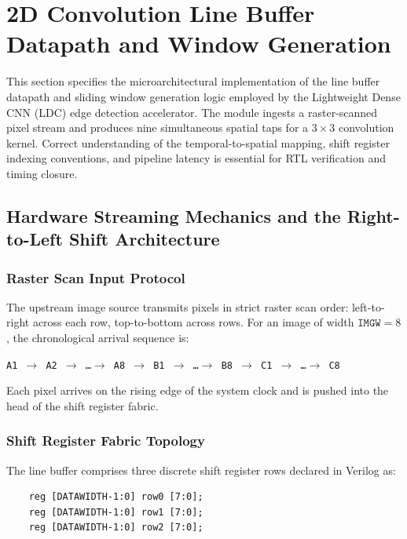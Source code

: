 \documentclass[11pt,a4paper]{report}
\begin{document}
\section{2D Convolution Line Buffer Datapath and Window Generation}

This section specifies the microarchitectural implementation of the line buffer datapath and sliding window generation logic employed by the Lightweight Dense CNN (LDC) edge detection accelerator. The module ingests a raster-scanned pixel stream and produces nine simultaneous spatial taps for a $3 \times 3$ convolution kernel. Correct understanding of the temporal-to-spatial mapping, shift register indexing conventions, and pipeline latency is essential for RTL verification and timing closure.

\subsection{Hardware Streaming Mechanics and the Right-to-Left Shift Architecture}

\subsubsection{Raster Scan Input Protocol}

The upstream image source transmits pixels in strict raster scan order: left-to-right across each row, top-to-bottom across rows. For an image of width $\mathtt{IMGW} = 8$, the chronological arrival sequence is:

\begin{center}
\texttt{A1 $\rightarrow$ A2 $\rightarrow$ \ldots $\rightarrow$ A8 $\rightarrow$ B1 $\rightarrow$ \ldots $\rightarrow$ B8 $\rightarrow$ C1 $\rightarrow$ \ldots $\rightarrow$ C8}
\end{center}

Each pixel arrives on the rising edge of the system clock and is pushed into the head of the shift register fabric.

\subsubsection{Shift Register Fabric Topology}

The line buffer comprises three discrete shift register rows declared in Verilog as:

\begin{verbatim}
    reg [DATAWIDTH-1:0] row0 [7:0];
    reg [DATAWIDTH-1:0] row1 [7:0];
    reg [DATAWIDTH-1:0] row2 [7:0];
\end{verbatim}
\end{document}
